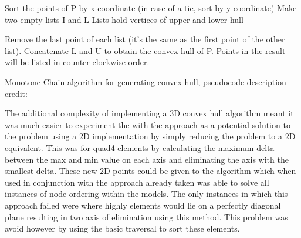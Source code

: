 \begin{algorithm}[H]



	Sort the points of P by x-coordinate (in case of a tie, sort by y-coordinate)\;
	Make two empty lists I and L
	Lists hold vertices of upper and lower hull\;
	
	
	
Remove the last point of each list (it's the same as the first point of the other list).\;
Concatenate L and U to obtain the convex hull of P.\;
Points in the result will be listed in counter-clockwise order.\;

\caption{Monotone Chain algorithm for generating convex hull, pseudocode description credit: \cite{MonotoneChain}}\label{MonotoneChain}
\end{algorithm}




\noindent
\newline


\noindent
The additional complexity of implementing a 3D convex hull algorithm meant it was much easier to experiment the with the approach as a potential solution to the problem using a 2D implementation by simply reducing the problem to a 2D equivalent. This was for quad4 elements by calculating the maximum delta between the max and min value on each axis and eliminating the axis with the smallest delta. These new 2D points could be given to the algorithm which when used in conjunction with the approach already taken was able to solve all instances of node ordering within the models. The only instances in which this approach failed were where highly elements would lie on a perfectly diagonal plane resulting in two axis of elimination using this method. This problem was avoid however by using the basic traversal to sort these elements. \\ 

